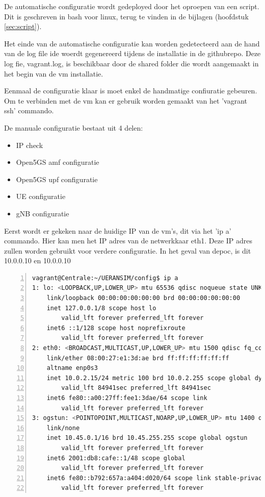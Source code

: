 De automatische configuratie wordt gedeployed door het oproepen van een script. Dit is geschreven in bash voor linux, terug te vinden in de bijlagen (hoofdstuk \ref{sec:script}).

Het einde van de automatische configuratie kan worden gedetecteerd aan de hand van de log file ide woerdt gegenereerd tijdens de installatie in de githubrepo. Deze log fie, vagrant.log, is beschikbaar door de shared folder die wordt aangemaakt in het begin van de \gls{vm} installatie. 

Eenmaal de configuratie klaar is moet enkel de handmatige confiuratie gebeuren.
Om te verbinden met de \gls{vm} kan er gebruik worden gemaakt van het 'vagrant ssh' commando.

De manuale configuratie bestaat uit 4 delen:

\begin{itemize}
    \item IP check
    \item Open5GS \gls{amf} configuratie
    \item Open5GS \gls{upf} configuratie
    \item UE configuratie
    \item gNB configuratie
\end{itemize}

Eerst wordt er gekeken naar de huidige IP van de \gls{vm}'s, dit via het 'ip a' commando. Hier kan men het IP adres van de netwerkkaar eth1. Deze IP adres zullen worden gebruikt voor verdere configuratie. In het geval van de\gls{poc}, is dit 10.0.0.10 en 10.0.0.10
\begin{lstlisting}[basicstyle=\small, frame=single, breaklines=true, postbreak=\mbox{\textcolor{red}{$\hookrightarrow$}\space}, escapeinside ={\%,}, escapechar={!}, numbers=left, language=sh, caption=IP configuratie]
vagrant@Centrale:~/UERANSIM/config$ ip a
1: lo: <LOOPBACK,UP,LOWER_UP> mtu 65536 qdisc noqueue state UNKNOWN group default qlen 1000
    link/loopback 00:00:00:00:00:00 brd 00:00:00:00:00:00
    inet 127.0.0.1/8 scope host lo
        valid_lft forever preferred_lft forever
    inet6 ::1/128 scope host noprefixroute
        valid_lft forever preferred_lft forever
2: eth0: <BROADCAST,MULTICAST,UP,LOWER_UP> mtu 1500 qdisc fq_codel state UP group default qlen 1000
    link/ether 08:00:27:e1:3d:ae brd ff:ff:ff:ff:ff:ff
    altname enp0s3
    inet 10.0.2.15/24 metric 100 brd 10.0.2.255 scope global dynamic eth0
        valid_lft 84941sec preferred_lft 84941sec
    inet6 fe80::a00:27ff:fee1:3dae/64 scope link
        valid_lft forever preferred_lft forever
3: ogstun: <POINTOPOINT,MULTICAST,NOARP,UP,LOWER_UP> mtu 1400 qdisc fq_codel state UP group default qlen 500
    link/none
    inet 10.45.0.1/16 brd 10.45.255.255 scope global ogstun
        valid_lft forever preferred_lft forever
    inet6 2001:db8:cafe::1/48 scope global
        valid_lft forever preferred_lft forever
    inet6 fe80::b792:657a:a404:d020/64 scope link stable-privacy
        valid_lft forever preferred_lft forever
\end{lstlisting}

